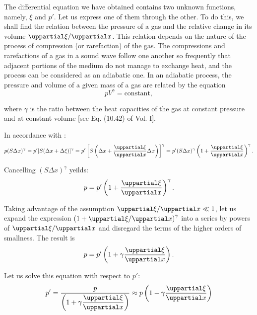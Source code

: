 The differential equation we have obtained contains two unknown functions, namely, $\xi$ and $p'$.
Let us express one of them through the other.
To do this, we shall find the relation between the pressure of a gas and the relative change in its volume $\diffpartialin{\xi}{x}$.
This relation depends on the nature of the process of compression (or rarefaction) of the gas.
The compressions and rarefactions of a gas in a sound wave follow one another so frequently that adjacent portions of the medium do not manage to exchange heat, and the process can be considered as an adiabatic one.
In an adiabatic process, the pressure and volume of a given mass of a gas are related by the equation
\begin{equation}\label{eq:14_66}
	p V^{\gamma} = \text{constant},
\end{equation}

\noindent
where $\gamma$ is the ratio between the heat capacities of the gas at constant pressure and at constant volume [see Eq. (10.42) of Vol. I].

In accordance with :
\begin{equation*}
	p (S \Delta{x})^{\gamma} = p'[S(\Delta{x}+\Delta{\xi})]^{\gamma} = p' \bracket{ S \parenthesis{\Delta{x} + \diffpartial{\xi}{x} \Delta{x}} }^{\gamma} = p' (S \Delta{x})^{\gamma} \parenthesis{1+ \diffpartial{\xi}{x}}^{\gamma}.
\end{equation*}

\noindent
Cancelling $(S \Delta{x})^{\gamma}$ yeilds:
\begin{equation*}
	p = p' \parenthesis{1+ \diffpartial{\xi}{x}}^{\gamma}.
\end{equation*}

\noindent
Taking advantage of the assumption $\diffpartialin{\xi}{x}\ll 1$, let us expand the expression $\parenthesis{1+ \diffpartialin{\xi}{x}}^{\gamma}$ into a series by powers of $\diffpartialin{\xi}{x}$ and disregard the terms of the higher orders of smallness.
The result is
\begin{equation*}
	p = p' \parenthesis{ 1 + \gamma \diffpartial{\xi}{x} }.
\end{equation*}

\noindent
Let us solve this equation with respect to $p'$:
\begin{equation}\label{eq:14_67}
	p' = \frac{p}{\parenthesis{1 + \gamma \diffpartial{\xi}{x}}} \approx p \parenthesis{ 1 - \gamma \diffpartial{\xi}{x} }
\end{equation}


